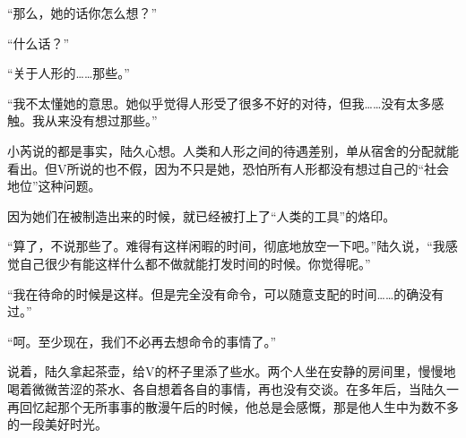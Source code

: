 “那么，她的话你怎么想？”

“什么话？”

“关于人形的……那些。”

“我不太懂她的意思。她似乎觉得人形受了很多不好的对待，但我……没有太多感触。我从来没有想过那些。”

小芮说的都是事实，陆久心想。人类和人形之间的待遇差别，单从宿舍的分配就能看出。但V所说的也不假，因为不只是她，恐怕所有人形都没有想过自己的“社会地位”这种问题。

因为她们在被制造出来的时候，就已经被打上了“人类的工具”的烙印。

“算了，不说那些了。难得有这样闲暇的时间，彻底地放空一下吧。”陆久说，“我感觉自己很少有能这样什么都不做就能打发时间的时候。你觉得呢。”

“我在待命的时候是这样。但是完全没有命令，可以随意支配的时间……的确没有过。”

“呵。至少现在，我们不必再去想命令的事情了。”

说着，陆久拿起茶壶，给V的杯子里添了些水。两个人坐在安静的房间里，慢慢地喝着微微苦涩的茶水、各自想着各自的事情，再也没有交谈。在多年后，当陆久一再回忆起那个无所事事的散漫午后的时候，他总是会感慨，那是他人生中为数不多的一段美好时光。